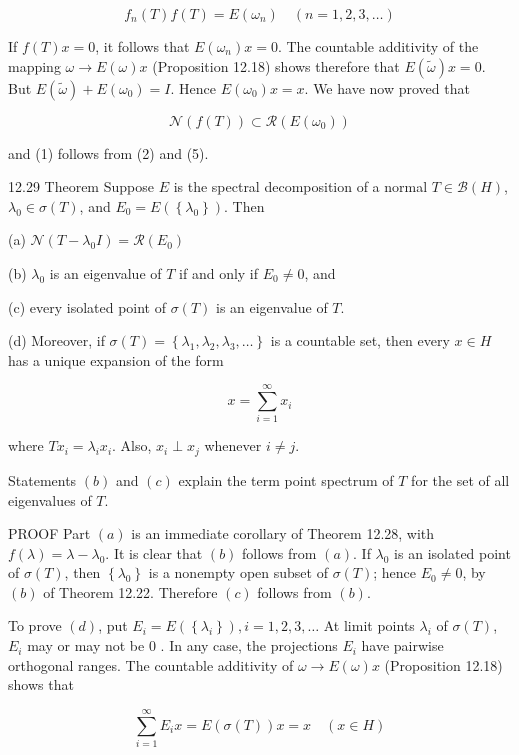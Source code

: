 \documentclass[10pt]{article}
\begin{document}
$$
f_{n}(T) f(T)=E\left(\omega_{n}\right) \quad(n=1,2,3, \ldots)
$$

If $f(T) x=0$, it follows that $E\left(\omega_{n}\right) x=0$. The countable additivity of the mapping $\omega \rightarrow E(\omega) x$ (Proposition 12.18) shows therefore that $E(\tilde{\omega}) x=0$. But $E(\tilde{\omega})+E\left(\omega_{0}\right)=I$. Hence $E\left(\omega_{0}\right) x=x$. We have now proved that

$$
\mathscr{N}(f(T)) \subset \mathscr{R}\left(E\left(\omega_{0}\right)\right)
$$

and (1) follows from (2) and (5).

12.29 Theorem Suppose $E$ is the spectral decomposition of a normal $T \in \mathscr{B}(H)$, $\lambda_{0} \in \sigma(T)$, and $E_{0}=E\left(\left\{\lambda_{0}\right\}\right)$. Then

(a) $\mathscr{N}\left(T-\lambda_{0} I\right)=\mathscr{R}\left(E_{0}\right)$

(b) $\lambda_{0}$ is an eigenvalue of $T$ if and only if $E_{0} \neq 0$, and

(c) every isolated point of $\sigma(T)$ is an eigenvalue of $T$.

(d) Moreover, if $\sigma(T)=\left\{\lambda_{1}, \lambda_{2}, \lambda_{3}, \ldots\right\}$ is a countable set, then every $x \in H$ has a unique expansion of the form

$$
x=\sum_{i=1}^{\infty} x_{i}
$$

where $T x_{i}=\lambda_{i} x_{i}$. Also, $x_{i} \perp x_{j}$ whenever $i \neq j$.

Statements $(b)$ and $(c)$ explain the term point spectrum of $T$ for the set of all eigenvalues of $T$.

PROOF Part $(a)$ is an immediate corollary of Theorem 12.28, with $f(\lambda)=\lambda-\lambda_{0}$. It is clear that $(b)$ follows from $(a)$. If $\lambda_{0}$ is an isolated point of $\sigma(T)$, then $\left\{\lambda_{0}\right\}$ is a nonempty open subset of $\sigma(T)$; hence $E_{0} \neq 0$, by $(b)$ of Theorem 12.22. Therefore $(c)$ follows from $(b)$.

To prove $(d)$, put $E_{i}=E\left(\left\{\lambda_{i}\right\}\right), i=1,2,3, \ldots$ At limit points $\lambda_{i}$ of $\sigma(T)$, $E_{i}$ may or may not be 0 . In any case, the projections $E_{i}$ have pairwise orthogonal ranges. The countable additivity of $\omega \rightarrow E(\omega) x$ (Proposition 12.18) shows that

$$
\sum_{i=1}^{\infty} E_{i} x=E(\sigma(T)) x=x \quad(x \in H)
$$
\end{document}
